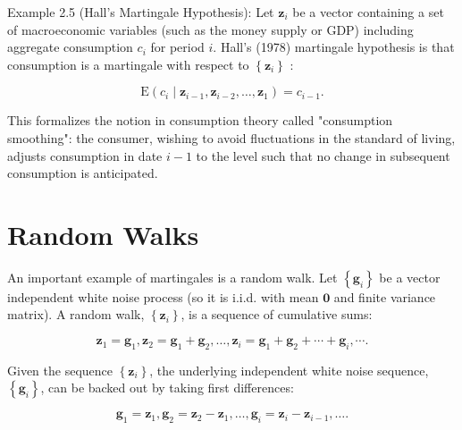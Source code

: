 \documentclass[10pt]{article}
\begin{document}
Example 2.5 (Hall's Martingale Hypothesis): Let $\mathbf{z}_{i}$ be a vector containing a set of macroeconomic variables (such as the money supply or GDP) including aggregate consumption $c_{i}$ for period $i$. Hall's (1978) martingale hypothesis is that consumption is a martingale with respect to $\left\{\mathbf{z}_{i}\right\}$ :

$$
\mathrm{E}\left(c_{i} \mid \mathbf{z}_{i-1}, \mathbf{z}_{i-2}, \ldots, \mathbf{z}_{1}\right)=c_{i-1} .
$$

This formalizes the notion in consumption theory called "consumption smoothing": the consumer, wishing to avoid fluctuations in the standard of living, adjusts consumption in date $i-1$ to the level such that no change in subsequent consumption is anticipated.

\section*{Random Walks}
An important example of martingales is a random walk. Let $\left\{\mathbf{g}_{i}\right\}$ be a vector independent white noise process (so it is i.i.d. with mean $\mathbf{0}$ and finite variance matrix). A random walk, $\left\{\mathbf{z}_{i}\right\}$, is a sequence of cumulative sums:


\begin{equation*}
\mathbf{z}_{1}=\mathbf{g}_{1}, \mathbf{z}_{2}=\mathbf{g}_{1}+\mathbf{g}_{2}, \ldots, \mathbf{z}_{i}=\mathbf{g}_{1}+\mathbf{g}_{2}+\cdots+\mathbf{g}_{i}, \cdots . \tag{2.2.6}
\end{equation*}


Given the sequence $\left\{\mathbf{z}_{i}\right\}$, the underlying independent white noise sequence, $\left\{\mathbf{g}_{i}\right\}$, can be backed out by taking first differences:


\begin{equation*}
\mathbf{g}_{1}=\mathbf{z}_{1}, \mathbf{g}_{2}=\mathbf{z}_{2}-\mathbf{z}_{1}, \ldots, \mathbf{g}_{i}=\mathbf{z}_{i}-\mathbf{z}_{i-1}, \ldots . \tag{2.2.7}
\end{equation*}
\end{document}
